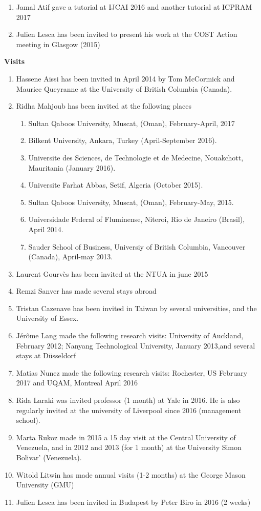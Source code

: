 \documentclass[version=last, pagesize, twoside=semi, DIV=calc, 12pt, a4paper, french, english, bibliography=totoc]{scrartcl}
\begin{document}
\begin{enumerate}
\item Jamal Atif gave a tutorial at IJCAI 2016 and another tutorial at   %
ICPRAM 2017 %
\item Julien Lesca has been invited to present his work at the COST Action meeting in Glasgow (2015)
\end{enumerate}

\noindent \textbf{Visits}~\begin{enumerate}
\item Hassene Aissi has been invited in April 2014 by Tom McCormick and Maurice Queyranne at the University of British Columbia (Canada).
\item Ridha Mahjoub has been invited at the following places \begin{enumerate} \item Sultan Qaboos University, Muscat, (Oman), February-April, 2017
\item Bilkent University, Ankara, Turkey (April-September 2016).
\item Universite des Sciences, de Technologie et de Medecine, Nouakchott, Mauritania (January 2016).          
\item Universite Farhat Abbas, Setif, Algeria (October 2015).
\item Sultan Qaboos University, Muscat, (Oman), February-May, 2015.
\item Universidade Federal of Fluminense, Niteroi, Rio de Janeiro (Brasil), April 2014.
\item Sauder School of Business, Universiy of British Columbia, Vancouver (Canada),   April-may 2013. 
\end{enumerate}
\item Laurent Gourv\`es has been invited at the NTUA in june 2015 
\item Remzi Sanver has made several stays abroad %
\item Tristan Cazenave has been invited in Taiwan by several universities, and the University of Essex.
\item J\'er\^ome Lang made the following research visits: University of Auckland, February 2012;  Nanyang Technological University, January 2013,and several stays at D\"usseldorf
\item Matias Nunez made the following research visits: Rochester, US February 2017 and UQAM, Montreal April 2016
\item Rida Laraki was invited professor (1 month) at  Yale in 2016. He is also regularly invited at the university of Liverpool since 2016 (management school).
 \item Marta Rukoz  made in 2015 a 15 day visit at the  Central University of Venezuela, and in  2012 and 2013 (for 1 month) at the University Simon Bolivar' (Venezuela).
\item Witold Litwin has made annual visits (1-2 months) at the George Mason University (GMU)
\item Julien Lesca has been invited 	in Budapest by Peter Biro in 2016 (2 weeks)
\end{enumerate}

\end{document}
